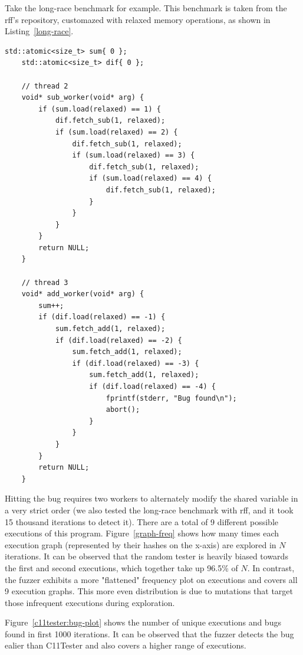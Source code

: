 Take the long-race benchmark for example. This benchmark is taken from the rff's repository, customazed with relaxed memory operations, as shown in Listing~\ref{long-race}.

\begin{lstlisting}[caption={long-race}, label={long-race}]
	std::atomic<size_t> sum{ 0 };
	std::atomic<size_t> dif{ 0 };
	
	// thread 2
	void* sub_worker(void* arg) {
		if (sum.load(relaxed) == 1) {
			dif.fetch_sub(1, relaxed);
			if (sum.load(relaxed) == 2) {
				dif.fetch_sub(1, relaxed);
				if (sum.load(relaxed) == 3) {
					dif.fetch_sub(1, relaxed);
					if (sum.load(relaxed) == 4) {
						dif.fetch_sub(1, relaxed);
					}
				}
			}
		}
		return NULL;
	}
	
	// thread 3
	void* add_worker(void* arg)	{
		sum++;
		if (dif.load(relaxed) == -1) {
			sum.fetch_add(1, relaxed);
			if (dif.load(relaxed) == -2) {
				sum.fetch_add(1, relaxed);
				if (dif.load(relaxed) == -3) {
					sum.fetch_add(1, relaxed);
					if (dif.load(relaxed) == -4) {
						fprintf(stderr, "Bug found\n");
						abort();
					}
				}
			}
		}
		return NULL;
	}
\end{lstlisting}

Hitting the bug requires two workers to alternately modify the shared variable in a very strict order (we also tested the long-race benchmark with rff, and it took 15 thousand iterations to detect it). There are a total of 9 different possible  executions of this program. Figure~\ref{graph-freq} shows how many times each execution graph (represented by their hashes on the x-axis) are explored in $N$ iterations. It can be observed that the random tester is heavily biased towards the first and second executions, which together take up 96.5\% of $N$. In contrast, the fuzzer exhibits a more "flattened" frequency plot on executions and covers all 9 execution graphs. This more even distribution is due to mutations that target those infrequent executions during exploration.

Figure~\ref{c11tester:bug-plot} shows the number of unique executions and bugs found in first 1000 iterations. It can be observed that the fuzzer detects the bug ealier than C11Tester and also covers a higher range of executions.




